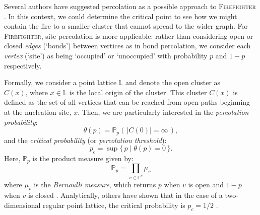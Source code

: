\documentclass[../report.tex]{subfiles}
\begin{document}
Several authors have suggested percolation as a possible approach to {\scshape Firefighter} \cite{finbow_2009}. In this context, we could determine the critical point to see how we might contain the fire to a smaller cluster that cannot spread to the wider graph. For {\scshape Firefighter}, site percolation is more applicable: rather than considering open or closed \emph{edges} (`bonds') between vertices as in bond percolation, we consider each \emph{vertex} (`site') as being `occupied' or `unoccupied' with probability $p$ and $1-p$ respectively.

Formally, we consider a point lattice $\mathbb{L}$ and denote the open cluster as $C(x)\text{,~where~}x\in\mathbb{L}$ is the local origin of the cluster. This cluster $C(x)$ is defined as the set of all vertices that can be reached from open paths beginning at the nucleation site, $x$. Then, we are particularly interested in the \emph{percolation probability}:
$$
\theta(p) = \mathbb{P}_p(\,|C(0)|=\infty\,),
$$
and the \emph{critical probability} (or \emph{percolation threshold}):
$$
p_c = \sup\{\,p \mid \theta(p)=0\,\}.
$$
Here, $\mathbb{P}_p$ is the product measure given by:
$$
\displaystyle \mathbb{P}_p=\prod_{v\in\mathbb{L}^d}\mu_v
$$
where $\mu_v$ is the \emph{Bernoulli measure}, which returns $p$ when $v$ is open and $1-p$ when $v$ is closed \cite[p. 28]{klenke_2014}. Analytically, others have shown that in the case of a two-dimensional regular point lattice, the critical probability is $p_c=1/2$ \cite{kersten_1980}.
\end{document}
